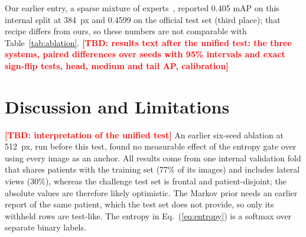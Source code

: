\documentclass{article}
\newcommand{\TBD}[1][]{\textcolor{red}{\textbf{[TBD#1]}}}
\begin{document}
\begin{table}[t]
\caption{Unified test on the internal validation split (17{,}270 images): 768~px, seed 42, one run per system, so no s.d. All systems share the Stage-1 checkpoint and the schedule; scores use the SWA weights with horizontal-flip test-time augmentation. Head, medium, tail: mean AP over 3, 20, 7 findings. mECE: lower is better.}
\label{tab:ablation}
\centering
\small
\setlength{\tabcolsep}{4pt}
\end{table}

Our earlier entry, a sparse mixture of experts~\cite{pham2026efficient}, reported 0.405 mAP on this internal split at 384~px and 0.4599 on the official test set (third place); that recipe differs from ours, so these numbers are not comparable with Table~\ref{tab:ablation}. \TBD[: results text after the unified test: the three systems, paired differences over seeds with 95\% intervals and exact sign-flip tests, head, medium and tail AP, calibration]

\section{Discussion and Limitations}
\label{sec:discussion}
\TBD[: interpretation of the unified test] An earlier six-seed ablation at 512~px, run before this test, found no measurable effect of the entropy gate over using every image as an anchor. All results come from one internal validation fold that shares patients with the training set (77\% of its images) and includes lateral views (30\%), whereas the challenge test set is frontal and patient-disjoint; the absolute values are therefore likely optimistic. The Markov prior needs an earlier report of the same patient, which the test set does not provide, so only its withheld rows are test-like. The entropy in Eq.~(\ref{eq:entropy}) is a softmax over separate binary labels.
\end{document}

